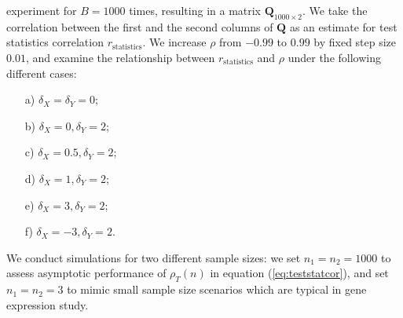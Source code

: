	experiment for $B=1000$ times, resulting in a matrix $\bm Q_{1000\times 2}$. We take the 
	correlation between the first and the second columns of $\bm Q$ as an estimate for test 
	statistics correlation	$r_\text{statistics}$. 
	We increase $\rho$ from $-0.99$ to $0.99$ by fixed step size $0.01$, and examine the 
	relationship between $r_\text{statistics}$ and $\rho$ under the following different cases:
	\begin{enumerate}
		\item[a)]  $\delta_X = \delta_Y  =0$;
		\item[b)]  $\delta_X = 0, \delta_Y=2$;
		\item[c)]  $\delta_X = 0.5, \delta_Y=2$;
		\item[d)]  $\delta_X = 1, \delta_Y=2$;
		\item[e)]  $\delta_X = 3, \delta_Y=2$;
		\item[f)]  $\delta_X = -3, \delta_Y=2$.
	\end{enumerate}
	
	We conduct simulations for two different sample sizes: we set $n_1 = n_2 = 1000$ to assess 
	asymptotic performance of $\rho_T(n)$ in equation (\ref{eq:teststatcor}), and set $n_1 = n_2 
	= 3$ to mimic small sample size scenarios which are typical in gene expression study. 
	
